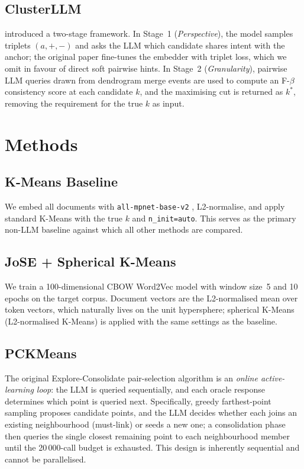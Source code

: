 \documentclass[10pt,twocolumn,a4paper]{article}
\begin{document}
\subsection{ClusterLLM}

\citet{zhang2023clusterllm} introduced a two-stage framework.
In Stage~1 (\emph{Perspective}), the model samples triplets $(a, +, -)$ and
asks the LLM which candidate shares intent with the anchor; the original paper
fine-tunes the embedder with triplet loss, which we omit in favour of direct
soft pairwise hints.
In Stage~2 (\emph{Granularity}), pairwise LLM queries drawn from dendrogram
merge events are used to compute an F-$\beta$ consistency score at each
candidate $k$, and the maximising cut is returned as $k^*$, removing the
requirement for the true $k$ as input.

\section{Methods}
\label{sec:methods}

\subsection{K-Means Baseline}

We embed all documents with \texttt{all-mpnet-base-v2}
\citep{reimers2019sentence}, L2-normalise, and apply standard K-Means with the
true $k$ and \texttt{n\_init=auto}.
This serves as the primary non-LLM baseline against which all other methods
are compared.

\subsection{JoSE + Spherical K-Means}

We train a 100-dimensional CBOW Word2Vec model with window size~5 and 10 epochs
on the target corpus.
Document vectors are the L2-normalised mean over token vectors, which naturally
lives on the unit hypersphere; spherical K-Means (L2-normalised K-Means) is
applied with the same settings as the baseline.

\subsection{PCKMeans}

The original Explore-Consolidate pair-selection algorithm
\citep{basu2004active,viswanathan2023large} is an \emph{online active-learning
loop}: the LLM is queried sequentially, and each oracle response determines
which point is queried next.
Specifically, greedy farthest-point sampling proposes candidate points, and the
LLM decides whether each joins an existing neighbourhood (must-link) or seeds a
new one; a consolidation phase then queries the single closest remaining point to
each neighbourhood member until the 20\,000-call budget is exhausted.
This design is inherently sequential and cannot be parallelised.
\end{document}
